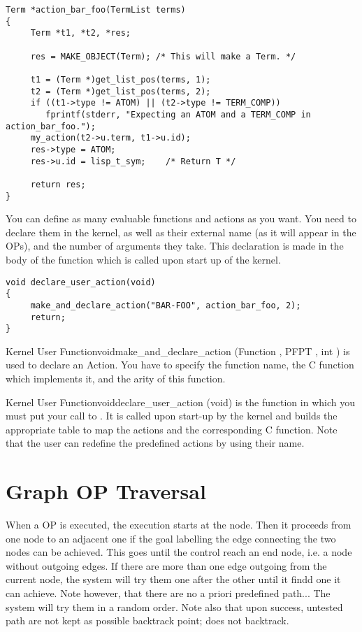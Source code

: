 \begin{verbatim}
Term *action_bar_foo(TermList terms)
{
     Term *t1, *t2, *res;

     res = MAKE_OBJECT(Term); /* This will make a Term. */

     t1 = (Term *)get_list_pos(terms, 1);
     t2 = (Term *)get_list_pos(terms, 2);
     if ((t1->type != ATOM) || (t2->type != TERM_COMP))
        fprintf(stderr, "Expecting an ATOM and a TERM_COMP in action_bar_foo.");
     my_action(t2->u.term, t1->u.id);
     res->type = ATOM;
     res->u.id = lisp_t_sym;    /* Return T */

     return res;
}
\end{verbatim}

You can define as many evaluable functions and actions as you want.
You need to declare them in the kernel, as well as their
external name (as it will appear in the OPs), and the number of arguments
they take. This declaration is made in the body of the
 function which is called upon start up of
the kernel.

\begin{verbatim}
void declare_user_action(void)
{
     make_and_declare_action("BAR-FOO", action_bar_foo, 2);
     return;
}
\end{verbatim}

\begin{typefn}{Kernel User Function}{void}{make\_and\_declare\_action} 
        {(Function , PFPT , int )} 
is used to declare an Action.  You have to specify the function name, the C
function which implements it, and the arity of this function.
\end{typefn}

\begin{typefn}{Kernel User Function}{void}{declare\_user\_action} {(void)}
is the function in which you must put your call to
. It is called upon start-up by the kernel and
builds the appropriate table to map the actions and the corresponding C
function.  Note that the user can redefine the predefined actions by using
their name.
\end{typefn}

\section{Graph OP Traversal}

When a OP is executed, the execution starts at the  node.
Then it proceeds from one node to an adjacent one if the goal labelling
the edge connecting the two nodes can be achieved. This goes until the
control reach an end node, i.e. a node without outgoing edges. If there
are more than one edge outgoing from the current node, the system will
try them one after the other until it findd one it can achieve. Note
however, that there are no a priori predefined path... The system will
try them in a random order. Note also that upon success, untested path
are not kept as possible backtrack point; \CPK{} does not backtrack.

